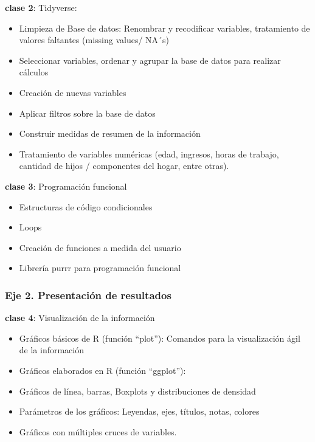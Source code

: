 \documentclass[]{book}
\providecommand{\tightlist}{%
  \setlength{\itemsep}{0pt}\setlength{\parskip}{0pt}}
\begin{document}
\textbf{clase 2}: Tidyverse:

\begin{itemize}
\tightlist
\item
  Limpieza de Base de datos: Renombrar y recodificar variables, tratamiento de valores faltantes (missing values/ NA´s)
\item
  Seleccionar variables, ordenar y agrupar la base de datos para realizar cálculos
\item
  Creación de nuevas variables
\item
  Aplicar filtros sobre la base de datos
\item
  Construir medidas de resumen de la información
\item
  Tratamiento de variables numéricas (edad, ingresos, horas de trabajo, cantidad de hijos / componentes del hogar, entre otras).
\end{itemize}

\textbf{clase 3}: Programación funcional

\begin{itemize}
\tightlist
\item
  Estructuras de código condicionales
\item
  Loops
\item
  Creación de funciones a medida del usuario
\item
  Librería purrr para programación funcional
\end{itemize}

\hypertarget{eje-2.-presentacion-de-resultados}{%
\subsubsection*{\texorpdfstring{\textbf{Eje 2. Presentación de resultados}}{Eje 2. Presentación de resultados}}\label{eje-2.-presentacion-de-resultados}}

\textbf{clase 4}: Visualización de la información

\begin{itemize}
\tightlist
\item
  Gráficos básicos de R (función ``plot''): Comandos para la visualización ágil de la información
\item
  Gráficos elaborados en R (función ``ggplot''):
\item
  Gráficos de línea, barras, Boxplots y distribuciones de densidad
\item
  Parámetros de los gráficos: Leyendas, ejes, títulos, notas, colores
\item
  Gráficos con múltiples cruces de variables.
\end{itemize}
\end{document}
